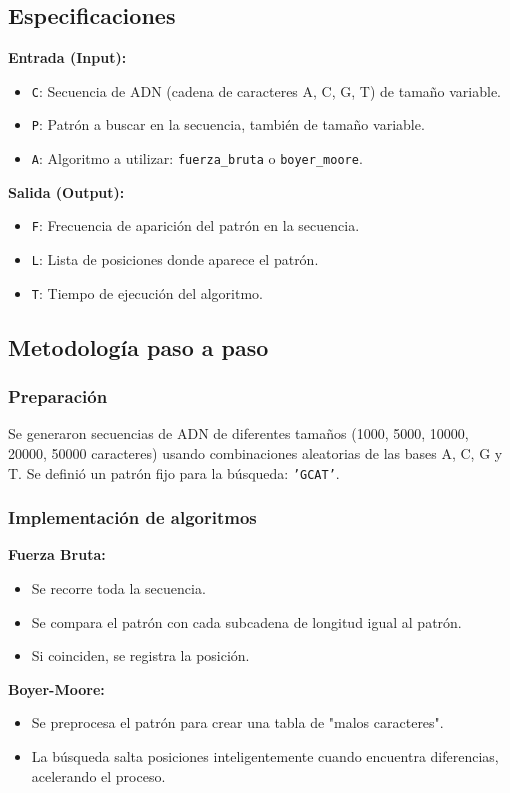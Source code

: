 \documentclass[fleqn,10pt]{article}
\begin{document}
\subsection{Especificaciones}
\textbf{Entrada (Input):}
\begin{itemize}
    \item \texttt{C}: Secuencia de ADN (cadena de caracteres A, C, G, T) de tamaño variable.
    \item \texttt{P}: Patrón a buscar en la secuencia, también de tamaño variable.
    \item \texttt{A}: Algoritmo a utilizar: \texttt{fuerza\_bruta} o \texttt{boyer\_moore}.
\end{itemize}
\textbf{Salida (Output):}
\begin{itemize}
    \item \texttt{F}: Frecuencia de aparición del patrón en la secuencia.
    \item \texttt{L}: Lista de posiciones donde aparece el patrón.
    \item \texttt{T}: Tiempo de ejecución del algoritmo.
\end{itemize}

\subsection{Metodología paso a paso}
\subsubsection{Preparación}
Se generaron secuencias de ADN de diferentes tamaños (1000, 5000, 10000, 20000, 50000 caracteres) usando combinaciones aleatorias de las bases A, C, G y T.
Se definió un patrón fijo para la búsqueda: \texttt{'GCAT'}.

\subsubsection{Implementación de algoritmos}
\textbf{Fuerza Bruta:}
\begin{itemize}
    \item Se recorre toda la secuencia.
    \item Se compara el patrón con cada subcadena de longitud igual al patrón.
    \item Si coinciden, se registra la posición.
\end{itemize}
\textbf{Boyer-Moore:}
\begin{itemize}
    \item Se preprocesa el patrón para crear una tabla de "malos caracteres".
    \item La búsqueda salta posiciones inteligentemente cuando encuentra diferencias, acelerando el proceso.
\end{itemize}
\end{document}
